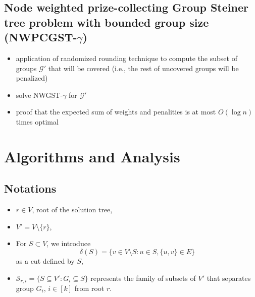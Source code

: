 \documentclass{beamer}
\begin{document}
\subsection*{Node weighted \alert{prize-collecting} Group Steiner tree problem with bounded group size (NW\alert{PC}GST-$\gamma$)}
\begin{frame}{\insertsection}{\insertsubsection}
    \begin{block}{}
        \begin{itemize}[<+->]
            \item application of randomized rounding technique to compute the subset of groups $\mathcal{G}'$ that will be covered (i.e., the rest of uncovered groups will be penalized)
            \item solve NWGST-$\gamma$ for $\mathcal{G}'$
            \item proof that the expected sum of weights and penalities is at most $O(\log n)$ times optimal
        \end{itemize}
    \end{block}
\end{frame}

\section{Algorithms and Analysis}
\subsection*{Notations}
\begin{frame}{\insertsection}{\insertsubsection}
    \begin{itemize}
        \item $r\in V$, root of the solution tree,
        \item $V'=V\setminus\{r\}$,
        \item  For $S\subset V$, we introduce $$\delta(S)=\{v\in V\setminus S:u\in S,\{u,v\}\in E\}$$ as a cut defined by $S$,
        \item $\mathcal{S}_{r,i}=\{S\subseteq V':G_i\subseteq S\}$ represents the family of subsets of $V'$ that separates group $G_i$, $i\in\left[k\right]$ from root $r$.
        
    \end{itemize} 
\end{frame}
\end{document}
